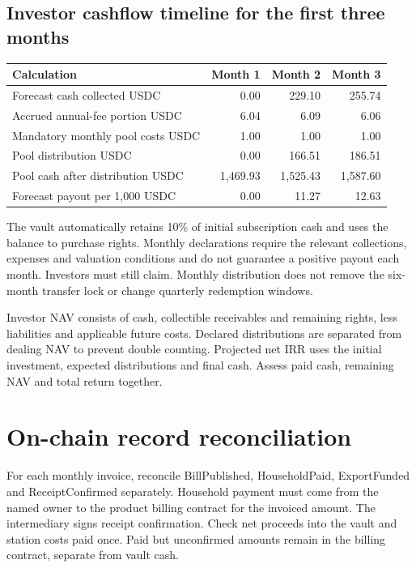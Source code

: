 \documentclass[12pt,a4paper]{article}
\begin{document}
\clearpage\begin{landscape}
\subsection{Investor cashflow timeline for the first three months}
\begin{center}\end{center}\begin{center}\begin{tabular}{L{11cm}rrr}\toprule Calculation & Month 1 & Month 2 & Month 3\\\midrule
Forecast cash collected USDC & 0.00 & 229.10 & 255.74\\
Accrued annual-fee portion USDC & 6.04 & 6.09 & 6.06\\
Mandatory monthly pool costs USDC & 1.00 & 1.00 & 1.00\\
Pool distribution USDC & 0.00 & 166.51 & 186.51\\
Pool cash after distribution USDC & 1,469.93 & 1,525.43 & 1,587.60\\
Forecast payout per 1,000 USDC & 0.00 & 11.27 & 12.63\\\bottomrule\end{tabular}\end{center}
The vault automatically retains 10\% of initial subscription cash and uses the balance to purchase rights. Monthly declarations require the relevant collections, expenses and valuation conditions and do not guarantee a positive payout each month. Investors must still claim. Monthly distribution does not remove the six-month transfer lock or change quarterly redemption windows.

Investor NAV consists of cash, collectible receivables and remaining rights, less liabilities and applicable future costs. Declared distributions are separated from dealing NAV to prevent double counting. Projected net IRR uses the initial investment, expected distributions and final cash. Assess paid cash, remaining NAV and total return together.

\end{landscape}
\clearpage\section{On-chain record reconciliation}
For each monthly invoice, reconcile BillPublished, HouseholdPaid, ExportFunded and ReceiptConfirmed separately. Household payment must come from the named owner to the product billing contract for the invoiced amount. The intermediary signs receipt confirmation. Check net proceeds into the vault and station costs paid once. Paid but unconfirmed amounts remain in the billing contract, separate from vault cash.
\end{document}

